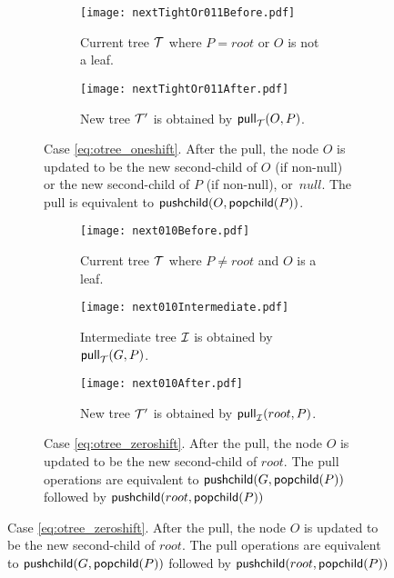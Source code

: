 \begin{figure}[H]
    \centering
    \begin{subfigure}{.98\textwidth}
        \captionsetup[subfigure]{justification=centering}
        \begin{subfigure}[t]{.49\textwidth}
            \centering
    	    \texttt{[image: nextTightOr011Before.pdf]}
    	    \caption*{Current tree $\tree{T}$ where ${P} = {root}$ or ${O}$ is not a leaf.}
            \label{fig:next1_Before}
        \end{subfigure}
        \hfill
        \begin{subfigure}[t]{.49\textwidth}
    	    \centering
    	    \texttt{[image: nextTightOr011After.pdf]}
    	    \caption*{New tree $\tree{T'}$ is obtained by $\pull[\tree{T}]{{O}}{{P}}$.}
            \label{fig:next1_Intermediate}
        \end{subfigure}
	    \caption{Case \eqref{eq:otree_oneshift}.
	    After the pull, the node ${O}$ is updated to be the new second-child of ${O}$ (if non-null) or the new second-child of ${P}$ (if non-null), or~${null}$.
	    The pull is equivalent to $\pushchild{{O}}{\popchild{{P}}}$.}
        \label{fig:next1}
    \end{subfigure}    

    \vspace{1em}
        
    \begin{subfigure}{.98\textwidth}
        \captionsetup[subfigure]{justification=centering}
        \begin{subfigure}[t]{.32\textwidth}
            \centering
    	    \texttt{[image: next010Before.pdf]}
    	    \caption*{Current tree $\tree{T}$ where ${P} \neq {root}$ and ${O}$ is a leaf.}
            \label{fig:next0_Before}
        \end{subfigure}
        \hfill
        \begin{subfigure}[t]{.32\textwidth}
    	    \centering
    	    \texttt{[image: next010Intermediate.pdf]}
    	    \caption*{Intermediate tree $\tree{I}$ is obtained by $\pull[\tree{T}]{{G}}{{P}}$.}
            \label{fig:next0_Intermediate}
        \end{subfigure}
        \begin{subfigure}[t]{.32\textwidth}
    	    \centering
    	    \texttt{[image: next010After.pdf]}
    	    \caption*{New tree $\tree{T'}$ is obtained by $\pull[\tree{I}]{{root}}{{P}}$.}
            \label{fig:next0_After}
        \end{subfigure}
	    \caption{Case \eqref{eq:otree_zeroshift}.
	    After the pull, the node ${O}$ is updated to be the new second-child of ${root}$.
	    The pull operations are equivalent to $\pushchild{{G}}{\popchild{{P}}}$ followed by $\pushchild{{root}}{\popchild{{P}}}$}
        \label{fig:next0}
    \end{subfigure}    
    

\end{figure}
